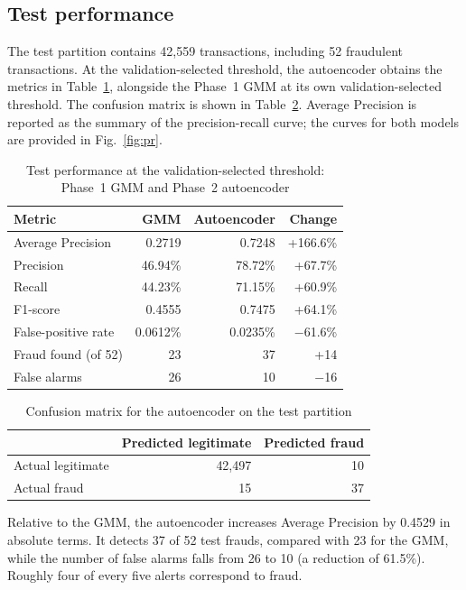 \documentclass[conference]{IEEEtran}
\begin{document}
\subsection{Test performance}
The test partition contains 42,559 transactions, including 52 fraudulent transactions. At the validation-selected threshold, the autoencoder obtains the metrics in Table~\ref{tab:metrics}, alongside the Phase~1 GMM at its own validation-selected threshold. The confusion matrix is shown in Table~\ref{tab:cm}. Average Precision is reported as the summary of the precision-recall curve; the curves for both models are provided in Fig.~\ref{fig:pr}.

\begin{table}[t]
\caption{Test performance at the validation-selected threshold: Phase~1 GMM and Phase~2 autoencoder}
\label{tab:metrics}
\centering
\small
\begin{tabular}{lrrr}
\toprule
Metric & GMM & Autoencoder & Change\\
\midrule
Average Precision & 0.2719 & 0.7248 & +166.6\%\\
Precision & 46.94\% & 78.72\% & +67.7\%\\
Recall & 44.23\% & 71.15\% & +60.9\%\\
F1-score & 0.4555 & 0.7475 & +64.1\%\\
False-positive rate & 0.0612\% & 0.0235\% & $-$61.6\%\\
Fraud found (of 52) & 23 & 37 & +14\\
False alarms & 26 & 10 & $-$16\\
\bottomrule
\end{tabular}
\end{table}

\begin{table}[t]
\caption{Confusion matrix for the autoencoder on the test partition}
\label{tab:cm}
\centering
\small
\begin{tabular}{lrr}
\toprule
 & Predicted legitimate & Predicted fraud\\
\midrule
Actual legitimate & 42,497 & 10\\
Actual fraud & 15 & 37\\
\bottomrule
\end{tabular}
\end{table}

Relative to the GMM, the autoencoder increases Average Precision by 0.4529 in absolute terms. It detects 37 of 52 test frauds, compared with 23 for the GMM, while the number of false alarms falls from 26 to 10 (a reduction of 61.5\%). Roughly four of every five alerts correspond to fraud.
\end{document}
